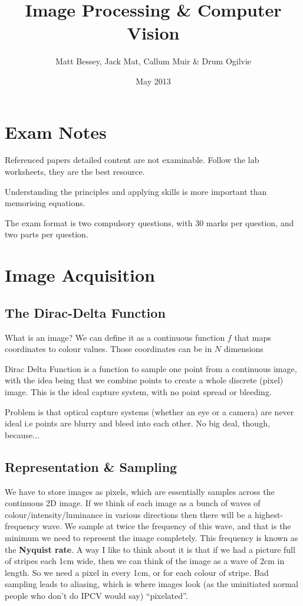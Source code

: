 \documentclass{article}
\title{Image Processing \& Computer Vision}
\author{Matt Bessey, Jack Mat, Callum Muir \& Drum Ogilvie}
\date{May 2013}
\begin{document}
\maketitle

\section{Exam Notes}
    Referenced papers detailed content are not examinable. Follow the lab worksheets, they are the best resource.
    
    Understanding the principles and applying skills is more important than memorising equations.
    
    The exam format is two compulsory questions, with 30 marks per question, and two parts per question.

\section{Image Acquisition}
    \subsection{The Dirac-Delta Function}
        What is an image? We can define it as a continuous function $f$ that maps coordinates to colour values. Those coordinates can be in $N$ dimensions

        Dirac Delta Function is a function to sample one point from a continuous image, with the idea being that we combine points to create a whole discrete (pixel) image. This is the ideal capture system, with no point spread or bleeding.
        
        Problem is that optical capture systems (whether an eye or a camera) are never ideal i.e points are blurry and bleed into each other. No big deal, though, because...

    
    \subsection{Representation \& Sampling}
        We have to store images as pixels, which are essentially samples across the continuous 2D image. If we think of each image as a bunch of waves of colour/intensity/luminance in various directions then there will be a highest-frequency wave. We sample at twice the frequency of this wave, and that is the minimum we need to represent the image completely. This frequency is known as the \textbf{Nyquist rate}.
        A way I like to think about it is that if we had a picture full of stripes each 1cm wide, then we can think of the image as a wave of 2cm in length. So we need a pixel in every 1cm, or for each colour of stripe.
        Bad sampling leads to aliasing, which is where images look (as the uninitiated normal people who don't do IPCV would say) ``pixelated''.
\end{document}
